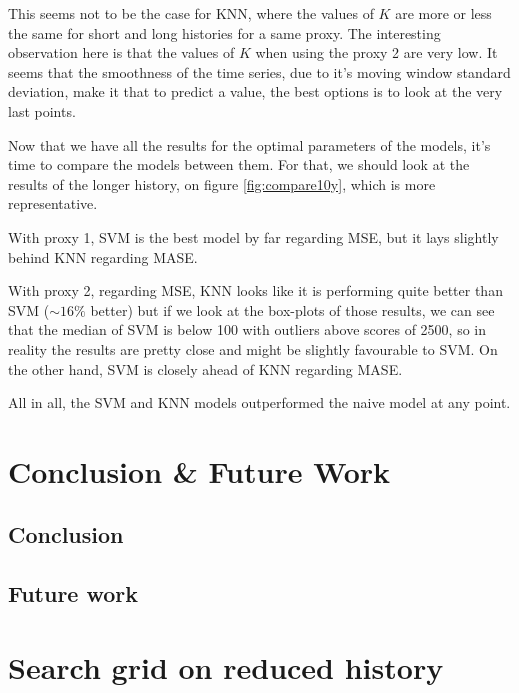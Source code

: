 \documentclass[11pt,a4paper,oneside]{book}
\begin{document}
This seems not to be the case for KNN, where the values of $K$ are more or less the same for short and long histories for a same proxy. The interesting observation here is that the values of $K$ when using the proxy 2 are very low. It seems that the smoothness of the time series, due to it's moving window standard deviation, make it that to predict a value, the best options is to look at the very last points.







Now that we have all the results for the optimal parameters of the models, it's time to compare the models between them. For that, we should look at the results of the longer history, on figure \ref{fig:compare10y}, which is more representative. 

With proxy 1, SVM is the best model by far regarding MSE, but it lays slightly behind KNN regarding MASE. 

With proxy 2, regarding MSE, KNN looks like it is performing quite better than SVM ($\sim 16\%$ better) but if we look at the box-plots of those results, we can see that the median of SVM is below 100 with outliers above scores of 2500, so in reality the results are pretty close and might be slightly favourable to SVM. On the other hand, SVM is closely ahead of KNN regarding MASE.

All in all, the SVM and KNN models outperformed the naive model at any point.




\chapter{Conclusion \& Future Work }


\section{Conclusion}


\section{Future work}




\clearpage
\appendix
\chapter{Search grid on reduced history}\label{6mapp}
\end{document}

